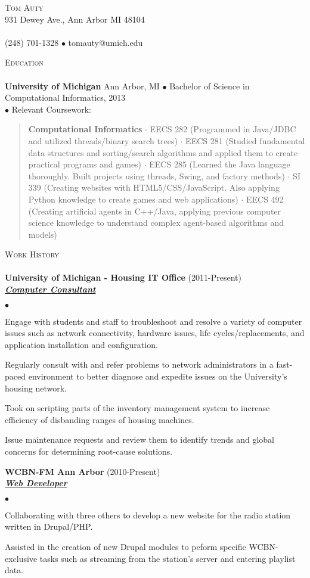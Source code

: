 \documentclass{article}
\newcommand{\area}[2]{\vspace*{-9pt} \begin{verse}\textbf{#1}   #2 \end{verse}  }
\newcommand{\lineunder}{\vspace*{-8pt} \\ \hspace*{-18pt} \hrulefill \\}
\newcommand{\header}[1]{{\hspace*{-15pt}\vspace*{6pt} \textsc{#1}} \vspace*{-6pt} \lineunder}
\newcommand{\employer}[3]{{ \textbf{#1} (#2)\\ \underline{\textbf{\emph{#3}}}\\  }}
\newcommand{\contact}[3]{
\vspace*{-4pt}
\begin{center}
{\LARGE \scshape {#1}}\\
#2 \lineunder 
#3
\end{center}
\vspace*{-8pt}
}
\newenvironment{achievements}{\begin{list}{$\bullet$}{\topsep 0pt \itemsep -2pt}}{\vspace*{4pt}\end{list}}
\newcommand{\schoolwithcourses}[4]{
 \textbf{#1} #2 $\bullet$ #3\\ 
#4 $\bullet$  Relevant Coursework:\\
\vspace*{8pt}
}
\begin{document}
\small
\smallskip
\vspace*{-44pt}

\contact{Tom Auty}
{931 Dewey Ave., Ann Arbor MI 48104}
{(248) 701-1328 $\bullet$ tomauty@umich.edu}

\header{Education}

\schoolwithcourses{University of Michigan}{Ann Arbor, MI}{Bachelor of Science in Computational Informatics, 2013}
{}
	\area{Computational Informatics}{ $\cdot$ EECS 282 (Programmed in Java/JDBC and utilized threads/binary search trees) $\cdot$ EECS 281 (Studied fundamental data structures and sorting/search algorithms and applied them to create practical programs and games) $\cdot$ EECS 285 (Learned the Java language thoroughly. Built projects using threads, Swing, and factory methods) $\cdot$ SI 339 (Creating websites with HTML5/CSS/JavaScript. Also applying Python knowledge to create games and web applications) $\cdot$ EECS 492 (Creating artificial agents in C++/Java, applying previous computer science knowledge to understand complex agent-based algorithms and models)}

\header{Work History}
\employer{University of Michigan - Housing IT Office}{2011-Present}{Computer Consultant}
	\begin{achievements}
	\item Engage with students and staff to troubleshoot and resolve a variety of computer issues such as network connectivity, hardware issues, life cycles/replacements, and application installation and configuration.
	\item Regularly consult with and refer problems to network administrators in a fast-paced environment to better diagnose and expedite issues on the University's housing network.
	\item Took on scripting parts of the inventory management system to increase efficiency of disbanding ranges of housing machines.
	\item Issue maintenance requests and review them to identify trends and global concerns for determining root-cause solutions.
	\end{achievements}

\employer{WCBN-FM Ann Arbor}{2010-Present}{Web Developer}
	\begin{achievements}
	\item Collaborating with three others to develop a new website for the radio station written in Drupal/PHP. 
	\item Assisted in the creation of new Drupal modules to peform specific WCBN-exclusive tasks such as streaming from the station's server and entering playlist data.
	\end{achievements}
\end{document}
